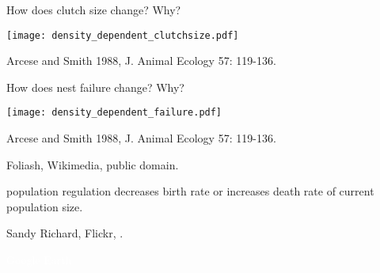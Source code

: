 \documentclass[t]{beamer}
\begin{document}
%
\begin{frame}[b]{How does clutch size change? Why?}
	\begin{center}
		\texttt{[image: density\_dependent\_clutchsize.pdf]}
	\end{center}	

	\tiny Arcese and Smith 1988, J. Animal Ecology 57: 119-136.
\end{frame}
%
\begin{frame}[b]{How does nest failure change? Why?}
	\begin{center}
		\texttt{[image: density\_dependent\_failure.pdf]}
	\end{center}	

	\tiny Arcese and Smith 1988, J. Animal Ecology 57: 119-136.
\end{frame}
%
{
\begin{frame}[b]{}
\tiny\textcolor{orange5}{Foliash, Wikimedia, public domain.}
\end{frame}
}
%
{
\begin{frame}[b]{}
\end{frame}
}
%
\begin{frame}{}

	\hangpara {} population regulation decreases birth rate or increases death rate  of current population size.
		
\end{frame}
%
{
\begin{frame}[b]{}
\hfill\tiny Sandy Richard, Flickr, .
\end{frame}
}
%
{
\begin{frame}[b]

	\hfill \tiny \textcolor{white}{Google Earth}
\end{frame}
}
%
{
\begin{frame}{}
\end{frame}
}
%
\end{document}
